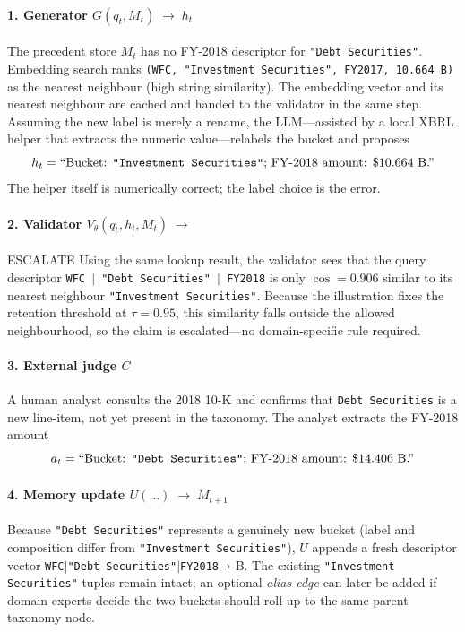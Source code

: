 \documentclass[11pt]{article}
\begin{document}
\paragraph{1. Generator $G(q_t,M_t)\;\longrightarrow\;h_t$}
The precedent store $M_t$ has no FY-2018 descriptor for
\texttt{"Debt Securities"}.  
Embedding search ranks  
\texttt{(WFC, "Investment Securities", FY2017, 10.664 B)}  
as the nearest neighbour (high string similarity).
The embedding vector and its nearest neighbour are cached and handed to the validator in the same step.
Assuming the new label is merely a rename, the LLM—assisted by a local
XBRL helper that extracts the numeric value—relabels the bucket and
proposes  
\[
h_t=\text{``Bucket: \texttt{"Investment Securities"}; FY-2018 amount: \$10.664 B.''}
\]
The helper itself is numerically correct; the label choice is the error.

\paragraph{2. Validator $V_\theta(q_t,h_t,M_t)\;\longrightarrow\;$} ESCALATE
Using the same lookup result, the validator sees that the query descriptor  
\texttt{WFC\,$\vert$\allowbreak\,"Debt Securities"\,$\vert$\allowbreak\,FY2018} is only  
$\cos=0.906$ similar to its nearest neighbour  
\texttt{"Investment Securities"}.  
Because the illustration fixes the retention threshold at $\tau=0.95$, this
similarity falls outside the allowed neighbourhood, so the claim is
escalated—no domain-specific rule required.

\paragraph{3. External judge $C$}
A human analyst consults the 2018 10-K and confirms that
\texttt{Debt Securities} is a new line-item, not yet present in
the taxonomy.  The analyst extracts the FY-2018 amount  
\[
a_t = \text{``Bucket: \texttt{"Debt Securities"}; FY-2018 amount: \$14.406 B.''}
\]

\paragraph{4. Memory update $U(\dots)\;\longrightarrow\;M_{t+1}$}
Because \texttt{"Debt Securities"} represents a genuinely new bucket
(label and composition differ from \texttt{"Investment Securities"}),
$U$ appends a fresh descriptor vector
\texttt{WFC$\mid$"Debt Securities"$\mid$FY2018}\;→ B.  
The existing \texttt{"Investment Securities"} tuples remain intact; an
optional \emph{alias edge} can later be added if domain experts decide
the two buckets should roll up to the same parent taxonomy node.
\end{document}
